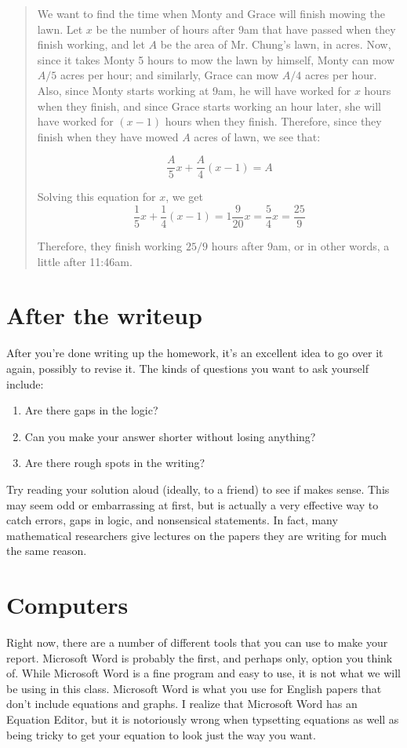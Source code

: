 \documentclass{article}
\begin{document}
\begin{quote}
We want to find the time when Monty and Grace will finish mowing the lawn. Let $x$ be the number of hours after 9am that have passed when they finish working, and let $A$ be the area of Mr. Chung's lawn, in acres. Now, since it takes Monty 5 hours to mow the lawn by himself, Monty can mow $A/5$ acres per hour; and similarly, Grace can mow $A/4$ acres per hour. Also, since Monty starts working at 9am, he will have worked for $x$ hours when they finish, and since Grace starts working an hour later, she will have worked for $(x − 1)$ hours when they finish. Therefore, since they finish when they have mowed $A$ acres of lawn, we see that:

\[
	\dfrac{A}{5}x + \dfrac{A}{4}(x-1) = A
\]

Solving this equation for $x$, we get
\[
	\dfrac{1}{5}x + \dfrac{1}{4}(x-1) = 1
	\dfrac{9}{20}x = \dfrac{5}{4}
	x = \dfrac{25}{9}
\]

Therefore, they finish working $25/9$ hours after 9am, or in other words, a little after 11:46am.
\end{quote}

\section*{After the writeup}

After you're done writing up the homework, it's an excellent idea to go over it again, possibly to revise it. The kinds of questions you want to ask yourself include:
\begin{enumerate}
\item Are there gaps in the logic?
\item Can you make your answer shorter without losing anything?
\item Are there rough spots in the writing?
\end{enumerate}

Try reading your solution aloud (ideally, to a friend) to see if makes sense. This may seem odd or embarrassing at first, but is actually a very effective way to catch errors, gaps in logic, and nonsensical statements. In fact, many mathematical researchers give lectures on the papers they are writing for much the same reason.

\section*{Computers}

Right now, there are a number of different tools that you can use to make your report. Microsoft Word is probably the first, and perhaps only, option you think of. While Microsoft Word is a fine program and easy to use, it is not what we will be using in this class. Microsoft Word is what you use for English papers that don't include equations and graphs. I realize that Microsoft Word has an Equation Editor, but it is notoriously wrong when typsetting equations as well as being tricky to get your equation to look just the way you want.
\end{document}
